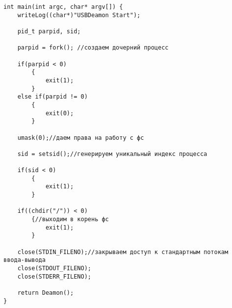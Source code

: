 \documentclass[12pt,a4paper]{scrartcl}
\begin{document}
\begin{verbatim}
int main(int argc, char* argv[]) {
    writeLog((char*)"USBDeamon Start");

    pid_t parpid, sid;
    
    parpid = fork(); //создаем дочерний процесс

    if(parpid < 0) 
        {
            exit(1);
        } 
    else if(parpid != 0) 
        {
            exit(0);
        } 

    umask(0);//даем права на работу с фс

    sid = setsid();//генерируем уникальный индекс процесса

    if(sid < 0) 
        {
            exit(1);
        }

    if((chdir("/")) < 0) 
        {//выходим в корень фс
            exit(1);
        }

    close(STDIN_FILENO);//закрываем доступ к стандартным потокам ввода-вывода
    close(STDOUT_FILENO);
    close(STDERR_FILENO);
    
    return Deamon();
}

\end{verbatim}
	\newpage
\end{document}
